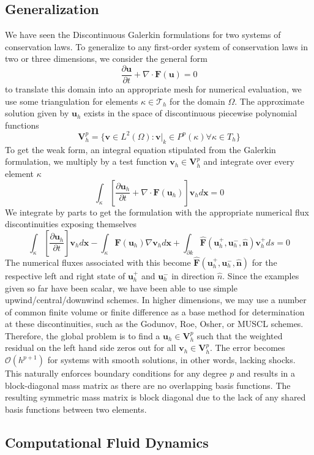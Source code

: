 \documentclass[openany]{book}
\newcommand{\p}[2]{\frac{\partial#1}{\partial#2}}
\begin{document}
\subsection{Generalization}
We have seen the Discontinuous Galerkin formulations for two systems of conservation laws. To generalize to any first-order system of conservation laws in two or three dimensions, we consider the general form
$$ \p{\mathbf{u}}{t} + \nabla \cdot \mathbf{F}(\mathbf{u}) = 0 $$
to translate this domain into an appropriate mesh for numerical evaluation, we use some triangulation for elements $\kappa \in \mathcal{T}_h$ for the domain $\Omega$. The approximate solution given by $\mathbf{u}_h$ exists in the space of discontinuous piecewise polynomial functions 
$$\mathbf{V}^p_h = \{ \mathbf{v} \in L^2(\Omega) : \mathbf{v}|_k \in P^p(\kappa) \forall \kappa \in T_h \}$$
To get the weak form, an integral equation stipulated from the Galerkin formulation, we multiply by a test function $\mathbf{v}_h \in \mathbf{V}^p_h$ and integrate over every element $\kappa$
$$\int_\kappa \left[\p{\mathbf{u}_h}{t} + \nabla \cdot \mathbf{F}(\mathbf{u}_h)\right]\mathbf{v}_h d\mathbf{x} = 0 $$
We integrate by parts to get the formulation with the appropriate numerical flux discontinuities exposing themselves
$$ \int_\kappa \left[\p{\mathbf{u}_h}{t}\right]\mathbf{v}_h d\mathbf{x} - \int_\kappa \mathbf{F}(\mathbf{u}_h)\nabla \mathbf{v}_h d\mathbf{x} + \int_{\partial k} \hat{\mathbf{F}}(\mathbf{u}^+_h,\mathbf{u}^-_h,\hat{\mathbf{n}})\mathbf{v}^+_h ds = 0$$
The numerical fluxes associated with this become $\hat{\mathbf{F}}(\mathbf{u}^+_h,\mathbf{u}^-_h,\hat{\mathbf{n}})$ for the respective left and right state of $\mathbf{u}^+_h$ and $\mathbf{u}^-_h$ in direction $\hat{n}$. Since the examples given so far have been scalar, we have been able to use simple upwind/central/downwind schemes. In higher dimensions, we may use a number of common finite volume or finite difference as a base method for determination at these discontinuities, such as the Godunov, Roe, Osher, or MUSCL schemes. Therefore, the global problem is to find a $\mathbf{u}_h \in \mathbf{V}^p_h$ such that the weighted residual on the left hand side zeros out for all $\mathbf{v}_h \in \mathbf{V}^p_h$. The error becomes $\mathcal{O}(h^{p+1})$ for systems with smooth solutions, in other words, lacking shocks. This naturally enforces boundary conditions for any degree $p$ and results in a block-diagonal mass matrix as there are no overlapping basis functions. The resulting symmetric mass matrix is block diagonal due to the lack of any shared basis functions between two elements.

\subsection{Computational Fluid Dynamics}
\end{document}
